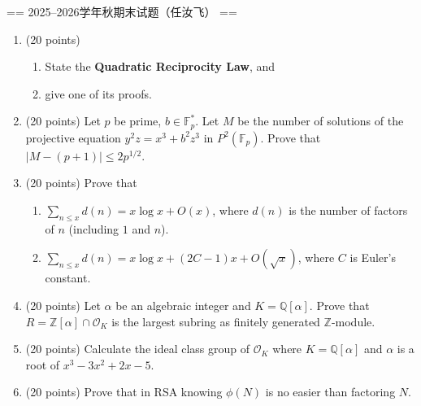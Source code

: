 
== 2025--2026学年秋期末试题（任汝飞） ==

\begin{enumerate}
    \item(20 points)
    \begin{enumerate}
        \item State the \textbf{Quadratic Reciprocity Law}, and
        \item give one of its proofs.
    \end{enumerate}

    \item(20 points) Let $p$ be prime, $b \in \mathbb{F}_{p}^{*}$. Let $M$ 
    be the number of solutions of the projective equation $y^{2}z = x^{3} + b^{2}z^{3}$ in $P^{2}(\mathbb{F}_{p})$. 
    Prove that $|M - (p + 1)| \leqslant 2p^{1/2}$.

    \item(20 points) Prove that \\
    \begin{enumerate}
        \item $\sum_{n \leqslant x}d(n) = x\log x + O(x)$, where $d(n)$ is the number of factors of $n$ (including $1$ and $n$).
        \item $\sum_{n \leqslant x}d(n) = x\log x + (2C - 1)x + O(\sqrt{x})$, where $C$ is Euler's constant.
    \end{enumerate}

    \item(20 points) Let $\alpha$ be an algebraic integer and $K = \mathbb{Q}[\alpha]$. 
    Prove that $R = \mathbb{Z}[\alpha] \cap \mathcal{O}_{K}$ is the largest subring as finitely generated $\mathbb{Z}$-module.

    \item(20 points) Calculate the ideal class group of $\mathcal{O}_{K}$ where $K = \mathbb{Q}[\alpha]$ and $\alpha$ is a root of $x^{3} - 3x^{2} + 2x - 5$.

    \item(20 points) Prove that in RSA knowing $\phi(N)$ is no easier than factoring $N$.
\end{enumerate}

